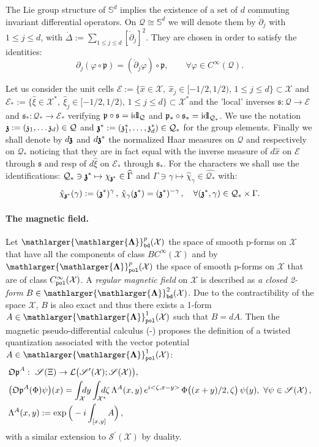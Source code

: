 \documentclass[12pt]{article}
\theoremstyle{definition}
\def\Sb{\mathbb{S}}
\def\Op{\mathfrak{Op}}
\def\X{\mathcal X}
\def\E{\mathcal E}
\def\T{\mathcal{Q}}
\def\id{{\rm id\hspace*{-1.5pt}l}}
\def\p{\mathfrak{p}}
\def\s{\mathfrak{s}}
\def\bz{\mathfrak{z}\hspace*{-4pt}\mathfrak{z}}
\def\z{\mathfrak{z}}
\def\beq{\begin{equation}}
\def\eeq{\end{equation}}
\def\Fb{\mathlarger{\mathlarger{\mathbf{\Lambda}}}_{\text{\tt bd}}}
\def\Fp{\mathlarger{\mathlarger{\mathbf{\Lambda}}}_{\text{\tt pol}}}
\def\z{\mathfrak{z}}
\numberwithin{equation}{section}
\begin{document}
 The Lie group structure of $\Sb^d$ implies the existence of a set of $d$ commuting invariant differential operators. On $\T\cong\Sb^d$ we will denote them by $\mathring{\partial}_j$ with $1\leq j\leq d$, with $\mathring{\Delta}:=\underset{1\leq j\leq d}{\sum}[\mathring{\partial}_j]^2$. They are chosen in order to satisfy the identities: 
 \beq\label{DF-T-deriv}
 \partial_j(\varphi\circ\p)=(\mathring{\partial}_j\varphi)\circ\p,\qquad\forall\varphi\in{C}^\infty(\T).
 \eeq


Let us consider the unit cells $\E:=\{\hat{x}\in\X,\ \hat{x}_j\in[-1/2,1/2),\,1\leq j\leq d\}\subset\X$ and $\E_*:=\{\hat{\xi}\in\X^*,\ \hat{\xi}_j\in[-1/2,1/2),\,1\leq j\leq d\}\subset\X^*$and the 'local' inverses $\s:\T\rightarrow\E$ and $\s_*:\T_*\rightarrow\E_*$ verifying $\p\circ\s=\id_{\T}$ and $\p_*\circ\s_*=\id_{\T_*}$. We use the notation $\bz:=(\z_1,\ldots\z_d)\in\T$ and $\bz^*:=(\z^*_1,\ldots,\z^*_d)\in\T_*$ for the group elements. Finally we shall denote by $d\bz$ and $d\bz^*$ the normalized Haar measures on $\T$ and respectively on $\T_*$ noticing that they are in fact equal with the inverse measure of $d\hat{x}$ on $\E$ through $\s$ and resp of $d\hat{\xi}$ on $\E_*$ through $\s_*$. For the characters we shall use the identifications: $\T_*\ni\bz^*\mapsto\chi_{\bz^*}\in\widehat{\Gamma}$ and $\Gamma\ni\gamma\mapsto\hat{\chi}_{\gamma}\in\widehat{\T_*}$  with:
\beq \label{DF-char-zst}
\hat{\chi}_{\bz^*}(\gamma):=(\bz^*)^{\gamma}\,, \, \hat{\chi}_{\gamma}(\bz^*)= (\bz^*)^{-\gamma}\,,\quad\forall(\bz^*,\gamma)\in\T_*\times\Gamma.
\eeq

\paragraph{The magnetic field.} Let $\Fb^p(\X)$ the space of smooth p-forms on $\X$ that have all the components of class $BC^\infty(\X)$ and by $\Fp^p(\X)$ the space of smooth p-forms on $\X$ that are of class $C^\infty_{\text{\tt pol}}(\X)$. A \textit{regular magnetic field} on $\X$ is described as \textit{a closed 2-form} $B\in\Fb^2(\X)$. Due to the contractibility of the space $\X$, $B$ is also exact and thus there exists a 1-form $A\in\Fp^1(\X)$ such that $B=dA$. Then the magnetic pseudo-differential calculus (\cite{MP-1,IMP-1}-\cite{IMP-3}) proposes the definition of a twisted quantization associated with  the vector potential $A\in\Fp^1(\X)$:
\beq\begin{split}\label{D-OpA}
	&\Op^A:\ \mathscr{S}(\Xi)\rightarrow\mathcal{L}\big(\mathscr{S}^\prime(\X);\mathscr{S}(\X)\big),\qquad\\
	&\big(\Op^A(\Phi)\psi\big)(x)=\int_{\X}\hspace*{-0.2cm}dy\int_{\X^*}\hspace*{-0.3cm}d\zeta\,\Lambda^A(x,y)\,e^{i<\zeta,x-y>}\,\Phi\big((x+y)/2,\zeta\big)\,\psi(y),\ \forall\psi\in\mathscr{S}(\X)\,,\\
	&\Lambda^A(x,y):=\exp\Big(-i\int_{[x,y]}A\Big)\,,
\end{split}\eeq
with a similar extension to $\mathscr{S}^\prime(\X)$ by duality.  
\end{document}
